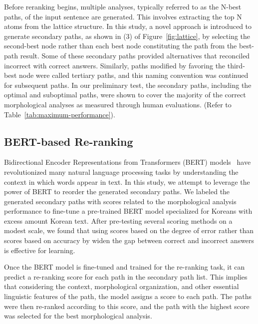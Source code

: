\documentclass[AMS,STIX2COL]{WileyNJD-v2}
\begin{document}
    Before reranking begins, multiple analyses, typically referred to as the N-best paths, of the input sentence are generated.
    This involves extracting the top N atoms from the lattice structure.
    In this study, a novel approach is introduced to generate secondary paths, as shown in (3) of Figure~\ref{fig:lattice}, by selecting the second-best node rather than each best node constituting the path from the best-path result.
    Some of these secondary paths provided alternatives that reconciled incorrect with correct answers.
    Similarly, paths modified by favoring the third-best node were called tertiary paths, and this naming convention was continued for subsequent paths.
    In our preliminary test, the secondary paths, including the optimal and suboptimal paths, were shown to cover the majority of the correct morphological analyses as measured through human evaluations. (Refer to Table~\ref{tab:maximum-performance}).

    \subsection{BERT-based Re-ranking}\label{subsec4.3}

    Bidirectional Encoder Representations from Transformers (BERT) models~\cite{Devlin2019} have revolutionized many natural language processing tasks by understanding the context in which words appear in text.
    In this study, we attempt to leverage the power of BERT to reorder the generated secondary paths.
    We labeled the generated secondary paths with scores related to the morphological analysis performance to fine-tune a pre-trained BERT model specialized for Koreans with excess amount Korean text.
    After pre-testing several scoring methods on a modest scale, we found that using scores based on the degree of error rather than scores based on accuracy by widen the gap between correct and incorrect answers is effective for learning.

    Once the BERT model is fine-tuned and trained for the re-ranking task, it can predict a re-ranking score for each path in the secondary path list.
    This implies that considering the context, morphological organization, and other essential linguistic features of the path, the model assigns a score to each path.
    The paths were then re-ranked according to this score, and the path with the highest score was selected for the best morphological analysis.
\end{document}
